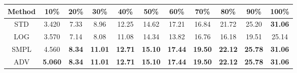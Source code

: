 \documentclass{standalone}
\begin{document}
\begin{tabular}{c|cccccccccc}
      \toprule
      Method & 10\% & 20\% & 30\% & 40\% & 50\% & 60\% & 70\% & 80\% & 90\% & 100\% \\
      \midrule
STD & 3.420 & 7.33 & 8.96 & 12.25 & 14.62 & 17.21 & 16.84 & 21.72 & 25.20 & \textbf{31.06}\\
LOG & 3.570 & 7.14 & 8.08 & 11.08 & 14.34 & 13.82 & 16.76 & 16.18 & 19.51 & 25.14\\
SMPL & 4.560 & \textbf{8.34} & \textbf{11.01} & \textbf{12.71} & \textbf{15.10} & \textbf{17.44} & \textbf{19.50} & \textbf{22.12} & \textbf{25.78} & \textbf{31.06}\\
ADV & \textbf{5.060} & \textbf{8.34} & \textbf{11.01} & \textbf{12.71} & \textbf{15.10} & \textbf{17.44} & \textbf{19.50} & \textbf{22.12} & \textbf{25.78} & \textbf{31.06}\\
  \bottomrule
\end{tabular}
\end{document}

